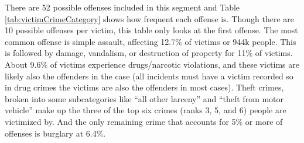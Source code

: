 \documentclass[
  12pt,
  openany]{book}
\begin{document}
There are 52 possible offenses included in this segment and Table \ref{tab:victimCrimeCategory} shows how frequent each offense is. Though there are 10 possible offenses per victim, this table only looks at the first offense. The most common offense is simple assault, affecting 12.7\% of victims or 944k people. This is followed by damage, vandalism, or destruction of property for 11\% of victims. About 9.6\% of victims experience drugs/narcotic violations, and these victims are likely also the offenders in the case (all incidents must have a victim recorded so in drug crimes the victims are also the offenders in most cases). Theft crimes, broken into some subcategories like ``all other larceny'' and ``theft from motor vehicle'' make up the three of the top six crimes (ranks 3, 5, and 6) people are victimized by. And the only remaining crime that accounts for 5\% or more of offenses is burglary at 6.4\%.
\end{document}

